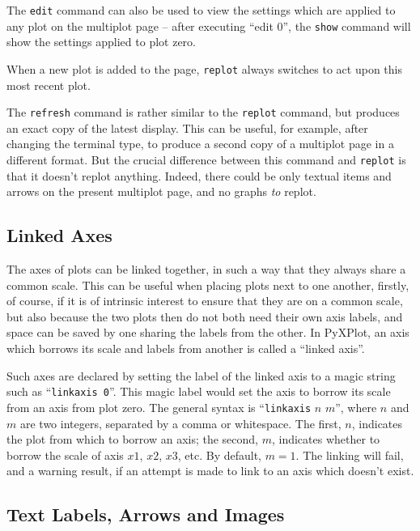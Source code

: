 \documentclass[a4paper,onecolumn,11pt]{book}
\begin{document}
The \texttt{edit} command can also be used to view the settings which are
applied to any plot on the multiplot page -- after executing ``edit 0'', the
\texttt{show} command will show the settings applied to plot zero.

When a new plot is added to the page, \texttt{replot} always switches to act
upon this most recent plot.

 The \texttt{refresh} command is
rather similar to the \texttt{replot} command, but produces an exact copy of
the latest display. This can be useful, for example, after changing the
terminal type, to produce a second copy of a multiplot page in a different
format. But the crucial difference between this command and \texttt{replot} is
that it doesn't replot anything. Indeed, there could be only textual items and
arrows on the present multiplot page, and no graphs \textit{to} replot.

\subsection{Linked Axes}

The axes of plots can be linked together, in such a way that they always share
a common scale. This can be useful when placing plots next to one another,
firstly, of course, if it is of intrinsic interest to ensure that they are on a
common scale, but also because the two plots then do not both need their own
axis labels, and space can be saved by one sharing the labels from the other.
In PyXPlot, an axis which borrows its scale and labels from another is called a
``linked axis''.

Such axes are declared by setting the label of the linked axis to a magic
string such as ``\texttt{linkaxis 0}''\label{linked_axes}. This magic label would set the axis to borrow
its scale from an axis from plot zero. The general syntax is
``\texttt{linkaxis} $n$ $m$'', where $n$ and $m$ are two integers, separated by
a comma or whitespace. The first, $n$, indicates the plot from which to borrow
an axis; the second, $m$, indicates whether to borrow the scale of axis $x1$,
$x2$, $x3$, etc. By default, $m=1$. The linking will fail, and a warning
result, if an attempt is made to link to an axis which doesn't exist.

\subsection{Text Labels, Arrows and Images}
\end{document}
